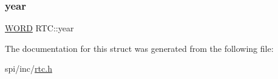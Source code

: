 \mbox{\label{struct_r_t_c_acb5071073b17bef18e2e0c0cf10900e1}} 
\subsubsection{\texorpdfstring{year}{year}}
{\footnotesize\ttfamily \mbox{\hyperlink{integer_8h_a197942eefa7db30960ae396d68339b97}{W\+O\+RD}} R\+T\+C\+::year}



The documentation for this struct was generated from the following file\+:\begin{DoxyCompactItemize}
\item 
spi/inc/\mbox{\hyperlink{rtc_8h}{rtc.\+h}}\end{DoxyCompactItemize}

